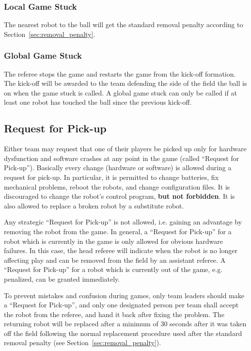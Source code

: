 \documentclass[12pt]{article}
\begin{document}
\subsubsection{Local Game Stuck}
\label{sec:game_stuck:local}

The nearest robot to the ball will get the standard removal penalty according to Section~\ref{sec:removal_penalty}.

\subsubsection{Global Game Stuck}
\label{sec:game_stuck:global}

The referee stops the game and restarts the game from the kick-off formation. The kick-off will be awarded to the team defending the side of the field the ball is on when the game stuck is called. A global game stuck can only be called if at least one robot has touched the ball since the previous kick-off.

\subsection{Request for Pick-up}
\label{sec:request_for_pickup}

Either team may request that one of their players be picked up only for hardware dysfunction and software crashes at any point in the game (called ``Request for Pick-up''). 
Basically every change (hardware or software) is allowed during a request for pick-up. In particular,
it is permitted to change batteries, fix mechanical problems, reboot the robots, and change configuration files.
It is discouraged to change the robot's control program, \textbf{but not forbidden}.
It is also allowed to replace a broken robot by a substitute robot.

Any strategic ``Request for Pick-up'' is not allowed, i.e. gaining an advantage by removing the robot from the game.
In general, a ``Request for Pick-up'' for a robot which is currently in the game is only allowed for obvious hardware failures.
In this case, the head referee will indicate when the robot is no longer affecting play and can be removed from the field by an assistant referee.
A ``Request for Pick-up'' for a robot which is currently out of the game, e.g. penalized, can be granted immediately.

To prevent mistakes and confusion during games, only team leaders should make a ``Request for Pick-up'', and only one designated person per team shall accept the robot from the referee, and hand it back after fixing the problem.
The returning robot will be replaced after a minimum of 30 seconds after it was taken off the field following the normal replacement procedure used after the standard removal penalty (see Section~\ref{sec:removal_penalty}).
\end{document}
